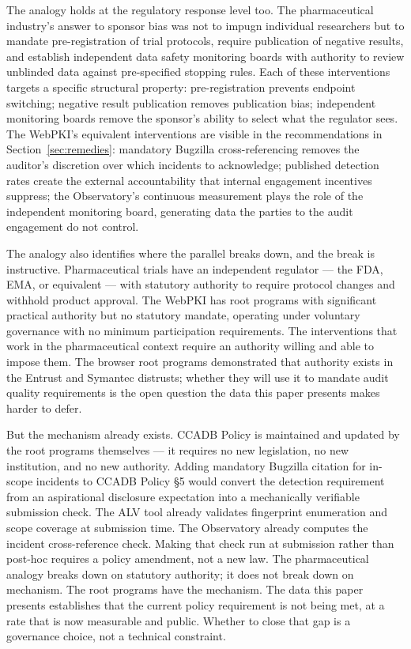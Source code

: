 \documentclass[10pt,twocolumn,letterpaper]{article}
\begin{document}
The analogy holds at the regulatory response level too. The
pharmaceutical industry's answer to sponsor bias was not to impugn
individual researchers but to mandate pre-registration of trial
protocols, require publication of negative results, and establish
independent data safety monitoring boards with authority to review
unblinded data against pre-specified stopping rules. Each of these
interventions targets a specific structural property: pre-registration
prevents endpoint switching; negative result publication removes
publication bias; independent monitoring boards remove the sponsor's
ability to select what the regulator sees. The WebPKI's equivalent
interventions are visible in the recommendations in
Section~\ref{sec:remedies}: mandatory Bugzilla cross-referencing
removes the auditor's discretion over which incidents to acknowledge;
published detection rates create the external accountability that
internal engagement incentives suppress; the Observatory's continuous
measurement plays the role of the independent monitoring board,
generating data the parties to the audit engagement do not control.

The analogy also identifies where the parallel breaks down, and the
break is instructive. Pharmaceutical trials have an independent
regulator --- the FDA, EMA, or equivalent --- with statutory authority
to require protocol changes and withhold product approval. The WebPKI
has root programs with significant practical authority but no statutory
mandate, operating under voluntary governance with no minimum
participation requirements. The interventions that work in the
pharmaceutical context require an authority willing and able to impose
them. The browser root programs demonstrated that authority exists in
the Entrust and Symantec distrusts; whether they will use it to mandate
audit quality requirements is the open question the data this paper
presents makes harder to defer.

But the mechanism already exists. CCADB Policy is maintained and updated
by the root programs themselves --- it requires no new legislation, no new
institution, and no new authority. Adding mandatory Bugzilla citation for
in-scope incidents to CCADB Policy \S5 would convert the detection requirement
from an aspirational disclosure expectation into a mechanically verifiable
submission check. The ALV tool already validates fingerprint enumeration
and scope coverage at submission time. The Observatory already computes
the incident cross-reference check. Making that check run at submission
rather than post-hoc requires a policy amendment, not a new law.
The pharmaceutical analogy breaks down on statutory authority; it does
not break down on mechanism. The root programs have the mechanism.
The data this paper presents establishes that the current policy
requirement is not being met, at a rate that is now measurable and public.
Whether to close that gap is a governance choice, not a technical
constraint.
\end{document}
